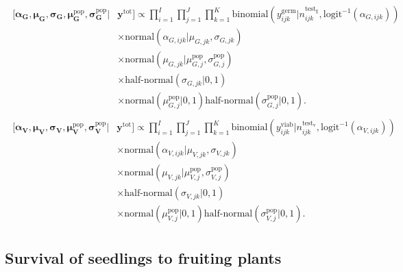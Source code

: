 \documentclass[12pt, oneside, titlepage]{article}   	%
\begin{document}
\begin{align}
  \begin{split}
 [  \bm{\alpha_G} , \bm{\mu_G} , \bm{\sigma_G} , \bm{\mu^\mathrm{pop}_G}, \bm{\sigma^\mathrm{pop}_G} | & \bm{y^{\mathrm{tot}}}  ] \propto \prod_{i=1}^{I}   \prod_{j=1}^{J}  \prod_{k=1}^{K} 
   \mathrm{binomial} ( y^{\mathrm{germ}}_{ijk} | n^\mathrm{test_g}_{ijk}, \mathrm{logit}^{-1}( \alpha_{G,ijk} ) ) 
   \\ & \times \mathrm{normal} ( \alpha_{G,ijk}  | \mu_{G,jk}, \sigma{_{G,jk} })
  \\ & \times \mathrm{normal} ( \mu_{G,jk}  | \mu^\mathrm{pop}_{G,j}, \sigma^\mathrm{pop}_{G,j} )
  \\ & \times \textrm{half-normal} ( \sigma_{G,jk} | 0,1)
  \\ & \times \mathrm{normal} ( \mu^\mathrm{pop}_{G,j} | 0 , 1 ) \textrm{half-normal} ( \sigma^\mathrm{pop}_{G,j} | 0,1).
  \end{split}
\end{align}
%
\begin{align}
  \begin{split}
 [  \bm{\alpha_V} , \bm{\mu_V} , \bm{\sigma_V} , \bm{\mu^\mathrm{pop}_V}, \bm{\sigma^\mathrm{pop}_V} | & \bm{y^{\mathrm{tot}}}  ] \propto \prod_{i=1}^{I}   \prod_{j=1}^{J}  \prod_{k=1}^{K} 
   \mathrm{binomial} ( y^{\mathrm{viab}}_{ijk} | n^\mathrm{test_v}_{ijk}, \mathrm{logit}^{-1}( \alpha_{V,ijk} ) ) 
   \\ & \times \mathrm{normal} ( \alpha_{V,ijk}  | \mu_{V,jk}, \sigma{_{V,jk} })
  \\ & \times \mathrm{normal} ( \mu_{V,jk}  | \mu^\mathrm{pop}_{V,j}, \sigma^\mathrm{pop}_{V,j} )
  \\ & \times \textrm{half-normal} ( \sigma_{V,jk} | 0,1)
  \\ & \times \mathrm{normal} ( \mu^\mathrm{pop}_{V,j} | 0 , 1 ) \textrm{half-normal} ( \sigma^\mathrm{pop}_{V,j} | 0,1).
  \end{split}
\end{align}
%

\clearpage
\newpage

\subsection*{Survival of seedlings to fruiting plants}
\end{document}

